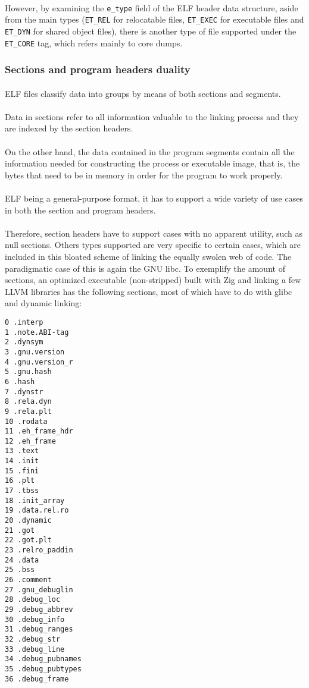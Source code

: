 \documentclass[12pt]{article}
\begin{document}
	\paragraph{}However, by examining the \verb|e_type| field of the ELF header data structure, aside from the main types (\verb|ET_REL| for relocatable files, \verb|ET_EXEC| for executable files and \verb|ET_DYN| for shared object files), there is another type of file supported under the \verb|ET_CORE| tag, which refers mainly to core dumps.
	
	\subsubsection{Sections and program headers duality}
	
	\paragraph{}ELF files classify data into groups by means of both sections and segments. \paragraph{}Data in sections refer to all information valuable to the linking process and they are indexed by the section headers.
	\paragraph{}On the other hand, the data contained in the program segments contain all the information needed for constructing the process or executable image, that is, the bytes that need to be in memory in order for the program to work properly.
	\paragraph{}ELF being a general-purpose format, it has to support a wide variety of use cases in both the section and program headers.
	\paragraph{}Therefore, section headers have to support cases with no apparent utility, such as null sections. Others types supported are very specific to certain cases, which are included in this bloated scheme of linking the equally swolen web of code. The paradigmatic case of this is again the GNU libc. To exemplify the amount of sections, an optimized executable (non-stripped) built with Zig and linking a few LLVM libraries has the following sections, most of which have to do with glibc and dynamic linking\cite{nativity}:
	\begin{verbatim}
0 .interp
1 .note.ABI-tag
2 .dynsym
3 .gnu.version 
4 .gnu.version_r
5 .gnu.hash
6 .hash
7 .dynstr
8 .rela.dyn
9 .rela.plt
10 .rodata
11 .eh_frame_hdr
12 .eh_frame
13 .text
14 .init
15 .fini
16 .plt
17 .tbss
18 .init_array
19 .data.rel.ro 
20 .dynamic
21 .got
22 .got.plt
23 .relro_paddin
24 .data
25 .bss
26 .comment
27 .gnu_debuglin
28 .debug_loc
29 .debug_abbrev
30 .debug_info
31 .debug_ranges
32 .debug_str
33 .debug_line
34 .debug_pubnames
35 .debug_pubtypes
36 .debug_frame		
	\end{verbatim}
	
\end{document}
